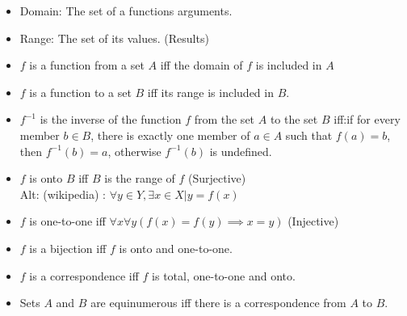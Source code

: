 \begin{itemize}
\item Domain: The set of a functions arguments. 
\item Range: The set of its values. (Results) 
\item $f$ is a function from a set $A$ iff the domain of $f$ is included in $A$ 

\item $f$ is a function to a set $B$ iff its range is included in $B$. 

\item $f^{-1}$ is the inverse of the function $f$ from the set $A$ to the set $B$ iff:if for every member $b \in B$, there is exactly one member of $a \in A$ such that $f(a)=b$, then $f^{-1}(b)=a$, otherwise $f^{-1}(b)$ is undefined.

\item $f$ is onto $B$ iff $B$ is the range of $f$ (Surjective) \\ 
Alt: (wikipedia) : $\forall y \in Y, \exists x \in X | y=f(x)$
\item $f$ is one-to-one iff $\forall x \forall y (f(x)=f(y)\implies x=y)$ (Injective)
\item $f$ is a bijection iff $f$ is onto and one-to-one.
\item $f$ is a correspondence iff $f$ is total, one-to-one and onto.
\item Sets $A$ and $B$ are equinumerous iff there is a correspondence from $A$ to $B$.%
\end{itemize}


